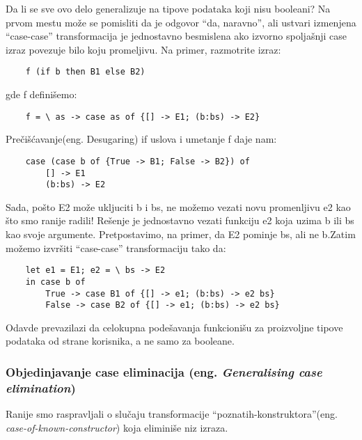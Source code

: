 Da li se sve ovo delo generalizuje na tipove podataka koji nisu booleani? Na prvom mestu može se pomisliti da je odgovor “da, naravno”, ali ustvari izmenjena “case-case” transformacija je jednostavno besmislena ako izvorno spoljašnji case izraz povezuje bilo koju promeljivu. Na primer, razmotrite izraz:
\begin{verbatim}
	f (if b then B1 else B2)
\end{verbatim}
gde f definišemo:
\begin{verbatim}
	f = \ as -> case as of {[] -> E1; (b:bs) -> E2}
\end{verbatim}
Prečišćavanje(eng. Desugaring) if uslova i umetanje f daje nam:
\begin{verbatim}
	case (case b of {True -> B1; False -> B2}) of
		[] -> E1
		(b:bs) -> E2
\end{verbatim}
Sada, pošto E2 može ukljuciti b i bs, ne možemo vezati novu promenljivu e2 kao što smo ranije radili! Rešenje je jednostavno vezati funkciju e2 koja uzima b ili bs kao svoje argumente. Pretpostavimo, na primer, da E2 pominje bs, ali ne b.Zatim možemo izvršiti “case-case” transformaciju tako da:
\begin{verbatim}
	let e1 = E1; e2 = \ bs -> E2
	in case b of
		True -> case B1 of {[] -> e1; (b:bs) -> e2 bs}
		False -> case B2 of {[] -> e1; (b:bs) -> e2 bs}
\end{verbatim}

Odavde prevazilazi da celokupna podešavanja funkcionišu za proizvoljne tipove podataka od strane korisnika, a ne samo za booleane.

\subsubsection{Objedinjavanje case eliminacija (eng. \emph{Generalising case elimination})}

Ranije smo raspravljali o slučaju transformacije “poznatih-konstruktora”(eng. \emph{case-of-known-constructor}) koja eliminiše niz izraza. 

